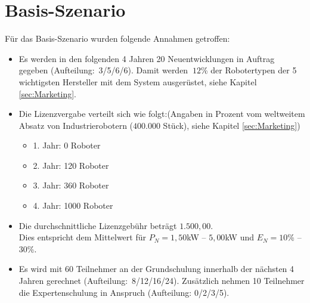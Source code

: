 \section{Basis-Szenario}
Für das Basis-Szenario wurden folgende Annahmen getroffen:
\begin{itemize}
	\item Es werden in den folgenden 4 Jahren 20 Neuentwicklungen in Auftrag gegeben (Aufteilung:~3/5/6/6). Damit werden $~12$\% der Robotertypen der 5 wichtigsten Hersteller mit dem System ausgerüstet, siehe Kapitel \ref{sec:Marketing}.
	\item Die Lizenzvergabe verteilt sich wie folgt:\newline (Angaben in Prozent vom weltweitem Absatz von Industrierobotern ($400.000$ Stück), siehe Kapitel \ref{sec:Marketing})
	\begin{itemize}
		\item 1. Jahr: 0 Roboter
		\item 2. Jahr: 120 Roboter
		\item 3. Jahr: 360 Roboter
		\item 4. Jahr: 1000 Roboter
	\end{itemize}
	\item Die durchschnittliche Lizenzgebühr beträgt $1.500,00$\officialeuro.\\ Dies entspricht dem Mittelwert für $P_N = 1,50$kW -- $5,00$kW und $E_N = 10$\% -- $30$\%.
	\item Es wird mit 60 Teilnehmer an der Grundschulung innerhalb der nächsten 4 Jahren gerechnet (Aufteilung:~8/12/16/24). Zusätzlich nehmen 10 Teilnehmer die Expertenschulung in Anspruch (Aufteilung: 0/2/3/5).
\end{itemize}

\newpage
